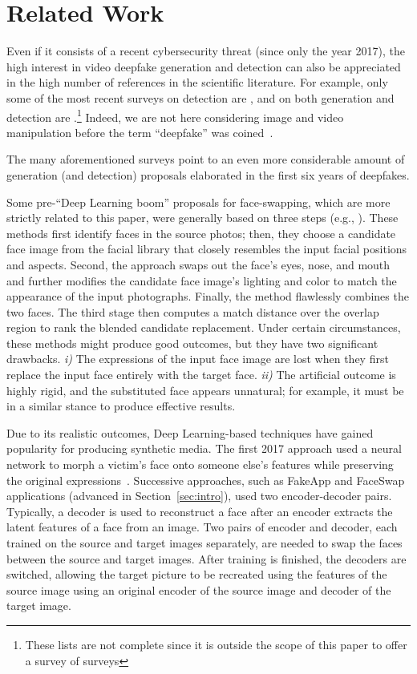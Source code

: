 \documentclass[sn-mathphys,Numbered]{sn-jnl}
\theoremstyle{thmstyleone}%
\theoremstyle{thmstyletwo}%
\theoremstyle{thmstylethree}%
\begin{document}
\section{Related Work}\label{sect:related}
Even if it consists of a recent cybersecurity threat (since only the year 2017), the high interest in video deepfake generation and detection can also be appreciated in the high number of references in the scientific literature. For example, only some of the most recent surveys on detection are \cite{surveydet,detection1,surveydet2}, and on both generation and detection are \cite{survey2,surveydgen1,survey3,survey4,survey1}.\footnote{These lists are not complete since it is outside the scope of this paper to offer a survey of surveys} Indeed, we are not here considering image and video manipulation before the term ``deepfake'' was coined~\cite{farid,bookvideoprocessing}.

The many aforementioned surveys point to an even more considerable amount of generation (and detection) proposals elaborated in the first  six years of deepfakes.

Some  pre-``Deep Learning boom'' proposals for face-swapping, which are more strictly related to this paper, were generally based on three steps (e.g., \cite{beforeDL}). These methods first identify faces in the source photos; then, they choose a candidate face image from the facial library that closely resembles the input facial positions and aspects. Second, the approach swaps out the face's eyes, nose, and mouth and further modifies the candidate face image's lighting and color to match the appearance of the input photographs. Finally, the method flawlessly combines the two faces. The third stage then computes a match distance over the overlap region to rank the blended candidate replacement. Under certain circumstances, these methods might produce good outcomes, but they have two significant drawbacks. \emph{i)} The expressions of the input face image are lost when they first replace the input face entirely with the target face. \emph{ii)} The artificial outcome is highly rigid, and the substituted face appears unnatural; for example, it must be in a similar stance to produce effective results.

Due to its realistic outcomes, Deep Learning-based techniques have gained popularity for producing synthetic media. The first 2017 approach used  a neural network to morph a victim’s face onto someone else’s features while preserving the original  expressions~\cite{survey2}. Successive approaches, such as FakeApp and FaceSwap applications (advanced in Section~\ref{sec:intro}),  used two encoder-decoder pairs. Typically, a decoder is used to reconstruct a face after an encoder extracts the latent features of a face from an image. Two pairs of encoder and decoder, each trained on the source and target images separately, are needed to swap the faces between the source and target images. After training is finished, the decoders are switched, allowing the target picture to be recreated using the features of the source image using an original encoder of the source image and decoder of the target image.
\end{document}
